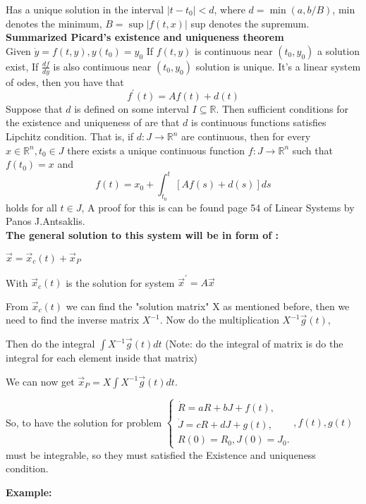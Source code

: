 \documentclass[a4paper]{article}
\begin{document}
Has a unique solution in the interval $\left|t-t_{0}\right|<d$, where $d=\min (a, b / B)$, min denotes the minimum, $B=\sup |f(t, x)|$ sup denotes the supremum.\\
\textbf{Summarized Picard's existence and uniqueness theorem}\\
Given $\dot{y}=f(t, y), y\left(t_0\right)=y_0$
If $f(t, y)$ is continuous near $\left(t_0, y_0\right)$ a solution exist,
If $\frac{d f}{d y}$ is also continuous near $\left(t_0, y_0\right)$ solution is unique.
It's a linear system of odes, then you have that
$$
f^{\prime}(t)=A f(t)+d(t)
$$
Suppose that $d$ is defined on some interval $I \subseteq \mathbb{R}$. Then sufficient conditions for the existence and uniqueness of are that $d$ is continuous functions satisfies Lipchitz condition.
That is, if $d: J \rightarrow \mathbb{R}^n$ are continuous, then for every $x \in \mathbb{R}^n, t_0 \in J$ there exists a unique continuous function $f: J \rightarrow \mathbb{R}^n$ such that $f\left(t_0\right)=x$ and
$$
f(t)=x_0+\int_{t_0}^t[A f(s)+d(s)] d s
$$
holds for all $t \in J$, A proof for this is can be found page 54 of Linear Systems by Panos J.Antsaklis.\\
 \textbf{The general solution to this system will be in form of : } \\
 \begin{center}$\vec{x}=\vec{x}_{c}(t)+\vec{x}_{P}$ \end{center}

With $\vec{x}_{c}(t)$ is the solution for system $\vec{x}^{\prime}=A \vec{x}$

From $\vec{x}_{c}(t)$ we can find the "solution matrix" $\mathrm{X}$ as mentioned before, then we need to find the inverse matrix $X^{-1}$. Now do the multiplication $X^{-1} \vec{g}(t)$,

Then do the integral $\int X^{-1} \vec{g}(t) d t$ (Note: do the integral of matrix is do the integral for each element inside that matrix)

We can now get $\vec{x}_{P}=X \int X^{-1} \vec{g}(t) d t$.

So, to have the solution for problem $\left\{\begin{array}{l}\dot{R}=a R+b J+f(t), \\ \dot{J}=c R+d J+g(t), \\ R(0)=R_{0}, J(0)=J_{0} .\end{array}, f(t), g(t)\right.$ must be integrable, so they must satisfied the Existence and uniqueness condition.

{\bf  Example:}
\end{document}
